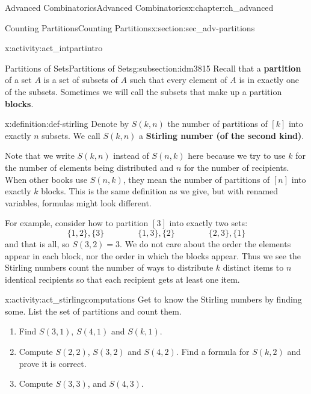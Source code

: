 \documentclass[oneside,10pt,]{book}
\newcommand{\terminology}[1]{\textbf{#1}}
\numberwithin{equation}{chapter}
\begin{document}
\begin{chapterptx}{Advanced Combinatorics}{}{Advanced Combinatorics}{}{}{x:chapter:ch_advanced}
\begin{sectionptx}{Counting Partitions}{}{Counting Partitions}{}{}{x:section:sec_adv-partitions}
\begin{introduction}{}
\begin{activity}{}{x:activity:act_intpartintro}
\begin{enumerate}[font=\bfseries,label=(\alph*),ref=\alph*]
\end{enumerate}
\end{activity}
\end{introduction}%
%
%
\typeout{************************************************}
\typeout{************************************************}
%
\begin{subsectionptx}{Partitions of Sets}{}{Partitions of Sets}{}{}{g:subsection:idm3815}
Recall that a \terminology{partition} of a set \(A\) is a set of subsets of \(A\) such that every element of \(A\) is in exactly one of the subsets.  Sometimes we will call the subsets that make up a partition \terminology{blocks}.%
\begin{definition}{}{x:definition:def-stirling}%
Denote by \(S(k,n)\) the number of partitions of \([k]\) into exactly \(n\) subsets.  We call \(S(k,n)\) a \terminology{Stirling number (of the second kind)}.%
\end{definition}
Note that we write \(S(k,n)\) instead of \(S(n,k)\) here because we try to use \(k\) for the number of elements being distributed and \(n\) for the number of recipients.  When other books use \(S(n,k)\), they mean the number of partitions of \([n]\) into exactly \(k\) blocks.  This is the same definition as we give, but with renamed variables, formulas might look different.%
\par
For example, consider how to partition \([3]\) into exactly two sets:%
\begin{equation*}
\{1,2\}, \{3\} \qquad \qquad \{1,3\},\{2\} \qquad \qquad \{2,3\},\{1\}
\end{equation*}
and that is all, so \(S(3,2) = 3\).  We do not care about the order the elements appear in each block, nor the order in which the blocks appear.  Thus we see the Stirling numbers count the number of ways to distribute \(k\) distinct items to \(n\) identical recipients so that each recipient gets at least one item.%
\begin{activity}{}{x:activity:act_stirlingcomputations}%
Get to know the Stirling numbers by finding some.  List the set of partitions and count them.%
\begin{enumerate}[font=\bfseries,label=(\alph*),ref=\alph*]
\item{}Find \(S(3,1)\), \(S(4,1)\) and \(S(k,1)\).%
\item{}Compute \(S(2,2)\), \(S(3,2)\) and \(S(4,2)\).  Find a formula for \(S(k,2)\) and prove it is correct.%
\item{}Compute \(S(3,3)\), and \(S(4,3)\).%

\end{enumerate}
\end{activity}
\end{subsectionptx}
\end{sectionptx}
\end{chapterptx}
\end{document}

